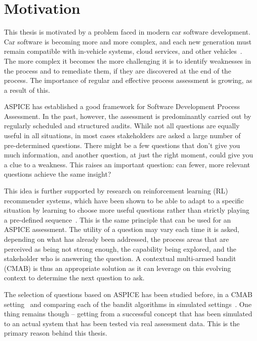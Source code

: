 \documentclass[a4paper, 12pt, oneside, openany, BCOR1cm,toc=chapterentrywithdots]{scrbook}
\begin{document}
\section{Motivation}

This thesis is motivated by a problem faced in modern car software development. Car software is
becoming more and more complex, and each new generation must remain compatible with in-vehicle
systems, cloud services, and other vehicles~\cite{zhang2021canbus,furst2010challenges}.
The more complex it becomes the more challenging it is to identify weaknesses in the process and
to remediate them, if they are discovered at the end of the process. The importance of regular and
effective process assessment is growing, as a result of this.

ASPICE has established a good framework for Software Development Process
Assessment. In the past, however, the assessment is predominantly carried out by regularly
scheduled and structured audits. While not all questions are equally useful in all situations, in
most cases stakeholders are asked a large number of pre-determined questions. There might be a few
questions that don't give you much information, and another question, at just the right moment,
could give you a clue to a weakness. This raises an important question: can fewer, more relevant
questions achieve the same insight?

This idea is further supported by research on reinforcement learning (RL) recommender systems, which
have been shown to be able to adapt to a specific situation by learning to choose more useful
questions rather than strictly playing a pre-defined sequence~\cite{datsogiannis2024early}. This
is the same principle that can be used for an ASPICE assessment. The utility of a question may
vary each time it is asked, depending on what has already been addressed, the process areas
that are perceived as being not strong enough, the capability being explored, and the stakeholder
who is answering the question. A contextual multi-armed bandit (CMAB) is thus an appropriate
solution as it can leverage on this evolving context to determine the next question to ask.

The selection of questions based on ASPICE has been studied before, in a CMAB
setting~\cite{datsogiannis2024early} and comparing each of the bandit algorithms in simulated
settings~\cite{datsogiannis2025recommender}. One thing remains though -- getting from a
successful concept that has been simulated to an actual system that has been tested via real
assessment data. This is the primary reason behind this thesis.
\end{document}
